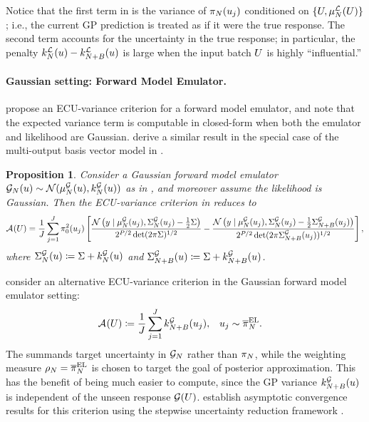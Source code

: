 \documentclass[12pt]{article}
\newtheorem{prop}{Proposition}
\begin{document}
Notice that the first term in  is the variance of $\postEm[\Ndesign](\Par_j)$ conditioned on
$\{\parMat, \emMean[\Ndesign]{\llik}(\parMat)\}$; i.e., the current GP prediction is treated as if it were the true response.
The second term accounts for the uncertainty in the true response; in particular, the penalty
$\emKer[\Ndesign]{\llik}(\Par) - \emKer[\Naugment]{\llik}(\Par)$ is large when the input batch $\parMat$ is highly 
``influential.''

\paragraph{Gaussian setting: Forward Model Emulator.}

\citet{SinsbeckNowak} propose an ECU-variance criterion for a forward model emulator, and note that 
the expected variance term is computable in closed-form when both the emulator and likelihood are Gaussian.
\citet{Surer2023sequential} derive a similar result in the special case of the multi-output basis vector 
model in .

\begin{prop} \label{prop:acq-intvar-fwd-Gaussian}
Consider a Gaussian forward model emulator 
$\fwdEm[\Ndesign](\Par) \sim \Gaussian(\emMean[\Ndesign]{\fwd}(\Par), \emKer[\Ndesign]{\fwd}(\Par))$
as in , and moreover assume the likelihood is Gaussian.
Then the ECU-variance criterion in  reduces to
\begin{align*}
\acq[](\parMat) = \frac{1}{J}
\sum_{j=1}^{J} \priorDens^2(\Par_j) \left[\frac{\Gaussian\left(\obs \given \emMean{\fwd}(\Par_j), \CovComb(\Par_j) - \frac{1}{2}\likPar \right)}{2^{\dimObs/2} \det(2\pi \likPar)^{1/2}} - 
\frac{\Gaussian\left(\obs \given \emMean{\fwd}(\Par_j), \CovComb(\Par_j) - \frac{1}{2}\CovComb[\Naugment](\Par_j) \right)}{2^{\dimObs/2} \det(2\pi \CovComb[\Naugment](\Par_j))^{1/2}} \right],
\end{align*}
where $\CovComb(\Par) \Def \likPar + \emKer{\fwd}(\Par)$ and $\CovComb[\Naugment](\Par) \Def \likPar + \emKer[\Naugment]{\fwd}(\Par)$.   
\label{eq:acq-intvar-saa-fwd}
\end{prop}

\citet{weightedIVAR} consider an alternative ECU-variance criterion in the Gaussian forward model emulator setting:
\begin{align}
&\acq[](\parMat) \Def \frac{1}{J}
\sum_{j=1}^{J} \emKer[\Naugment]{\fwd}(\Par_j),
&&\Par_j \sim \postApproxNormMarg.
 \label{eq:acq-intvar-lartaud}
\end{align}
The summands target uncertainty in $\fwdEm[\Ndesign]$ rather than $\postEm[\Ndesign]$, while the weighting measure
$\weightDens = \postApproxNormMarg$ is chosen to target the goal of posterior approximation. This has the 
benefit of being much easier to compute, since the GP variance $\emKer[\Naugment]{\fwd}(\Par)$ is independent of the 
unseen response $\fwd(\parMat)$. \citet{weightedIVAR} establish asymptotic convergence results for this criterion
using the stepwise uncertainty reduction framework \citep{BectSUR}. 
\end{document}
